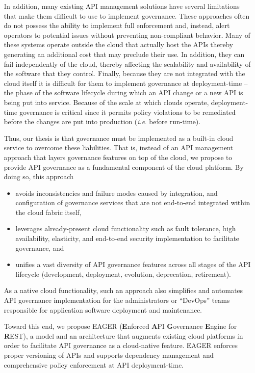 In addition, many existing
API management solutions have several limitations that make them difficult to
use to implement governance.  
These approaches often 
do not possess the ability to implement full enforcement and, instead, alert
operators to potential issues without preventing non-compliant behavior.
Many of these systems operate outside the 
cloud that actually host the APIs thereby generating an additional cost that
may preclude their use.
In addition, they can fail independently of the cloud, thereby affecting 
the scalability and availability of the software that they control.
Finally, because they are not integrated with the cloud itself it is difficult
for them to
implement governance at deployment-time -- the phase of the software lifecycle
during which an API change or a new API is being put into service.
Because of the scale at which clouds operate, deployment-time governance is
critical since it permits policy violations to be remediated before the
changes are put into production ({\em i.e.} before run-time).

Thus, our thesis is that governance must be implemented as a built-in cloud service to
overcome these liabilities.
That is, instead of an API management
approach that layers governance features on top of the cloud, 
we propose to provide API governance as a fundamental component of the cloud
platform.  By doing so, this approach
\begin{itemize}
\item avoids inconsistencies and failure modes caused  
by integration, and configuration of governance services that are not
end-to-end integrated within the cloud fabric itself, 
\item leverages already-present cloud functionality such as fault tolerance,
high availability, elasticity, and end-to-end security implementation to
facilitate governance, and
\item unifies a vast diversity of API
governance features across all stages of the API lifecycle
(development, deployment, evolution, deprecation, retirement). 
\end{itemize}
As a native cloud functionality, such an
approach also simplifies and automates API governance implementation for
the administrators or ``DevOps'' teams responsible for application
software deployment and
maintenance.

Toward this end, we propose EAGER ({\bf E}nforced {\bf A}PI {\bf G}overnance
{\bf E}ngine for {\bf R}EST), a model and an architecture that augments existing
cloud platforms in order to facilitate API governance as a 
cloud-native feature. EAGER enforces proper versioning of APIs and supports dependency 
management and comprehensive policy enforcement at API deployment-time. 

